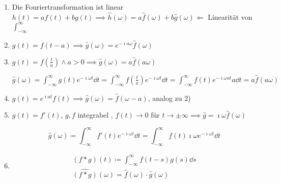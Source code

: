 \begin{enumerate}[label=\arabic*)]
	\item Die Fouriertransformation ist linear $h(t) = af(t) + bg(t) \implies \hat{h}(\omega) = a\hat{f}(\omega) + b\hat{g}(\omega) \Leftarrow$ Linearität von $\int_{-\infty}^\infty$
	\item $g(t) = f(t-a) \implies \hat{g}(\omega) = e^{-\imath a \omega} \hat{f}(\omega)$
	\item $g(t) = f\left( \frac{t}{a} \right) \wedge a > 0 \implies \hat{g}(\omega) = a \hat{f}(a\omega)$ \\
		\begin{bew}
			$\hat{g}(\omega) = \int_{-\infty}^\infty g(t) e^{-\imath\omega t} \dd t = \int_{-\infty}^\infty f\left( \frac{t}{a} \right) e^{-\imath\omega t} \dd t = \int_{-\infty}^\infty f(t) e^{-\imath\omega at} a \dd t = a \hat{f}(a\omega)$
		\end{bew}
	\item $g(t) = e^{\imath at} f(t) \implies \hat{g}(\omega) = \hat{f}(\omega - a)$, analog zu 2)
	\item $g(t) = f'(t)$, $g,f$ integrabel , $f(t) \rightarrow 0$ für $t \rightarrow \pm \infty \implies \hat{g} = \imath \omega \hat{f}(\omega)$ \\
		\begin{bew}
			\[ \hat{g}(\omega) = \int_{-\infty}^\infty f'(t) e^{-\imath \omega t} \dd t = \int_{-\infty}^\infty f(t) \imath\omega e^{-\imath \omega t} \dd t \]
		\end{bew}
	\item \begin{satz*}[note = Falltungssatz]
		\begin{gather*}
			(f*g)(t) \coloneqq \int_{-\infty}^\infty f(t-s) g(s) \dd s \\
			\widehat{(f*g)}(\omega) = \hat{f}(\omega) \cdot \hat{g}(\omega)
		\end{gather*}
	\end{satz*}
\end{enumerate}

